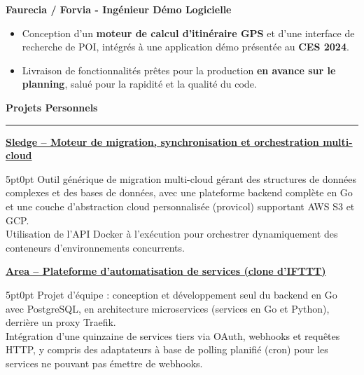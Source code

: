 \documentclass[9pt]{extarticle}
\begin{document}
\par\vspace{5pt}

{\bfseries Faurecia / Forvia - Ingénieur Démo Logicielle}
\begin{itemize}[noitemsep, topsep=0pt]
	\item Conception d'un {\bfseries moteur de calcul d'itinéraire GPS} et d'une interface de recherche de POI, intégrés à une application démo présentée au {\bfseries CES 2024}.
	\item Livraison de fonctionnalités prêtes pour la production {\bfseries en avance sur le planning}, salué pour la rapidité et la qualité du code.
\end{itemize}

\par\vspace{5pt}


{\large\bfseries Projets Personnels}
\par\vspace{-8pt}
\rule{\linewidth}{0.4pt}
\par\vspace{5pt}

\underline{\bfseries Sledge -- Moteur de migration, synchronisation et orchestration multi-cloud}
\par
\begin{adjustwidth}{5pt}{0pt}
    Outil générique de migration multi-cloud gérant des structures de données complexes et des bases de données, avec une plateforme backend complète en Go et une couche d'abstraction cloud personnalisée ({\ttfamily provicol}) supportant AWS S3 et GCP. \\
    Utilisation de l'API Docker à l'exécution pour orchestrer dynamiquement des conteneurs d'environnements concurrents.
\end{adjustwidth}

\par\vspace{8pt}

\underline{\bfseries Area -- Plateforme d'automatisation de services (clone d'IFTTT)}
\par
\begin{adjustwidth}{5pt}{0pt}
    Projet d'équipe : conception et développement seul du backend en Go avec PostgreSQL, en architecture microservices (services en Go et Python), derrière un proxy Traefik. \\
    Intégration d'une quinzaine de services tiers via OAuth, webhooks et requêtes HTTP, y compris des adaptateurs à base de polling planifié (cron) pour les services ne pouvant pas émettre de webhooks.
\end{adjustwidth}
\end{document}
